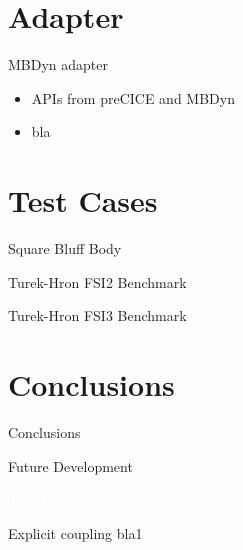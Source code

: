 \documentclass[10pt,t]{beamer}
\begin{document}
\section{Adapter}

\begin{frame}{MBDyn adapter}
    \begin{itemize}
        \item APIs from preCICE and MBDyn
        \item bla
    \end{itemize}
\end{frame}

\section{Test Cases}

\begin{frame}{Square Bluff Body}

    
\end{frame}

\begin{frame}{Turek-Hron FSI2 Benchmark}

    
\end{frame}


\begin{frame}{Turek-Hron FSI3 Benchmark}

    
\end{frame}


\section{Conclusions}

\begin{frame}{Conclusions}
    
\end{frame}

\begin{frame}{Future Development}
    
\end{frame}

\begin{frame}[c,plain]{}
    \centering
    \textcolor{white}{Thank you}
\end{frame}

\begin{frame}{Explicit coupling}\label{couplingdetails}
  bla1  
\end{frame}
\end{document}
